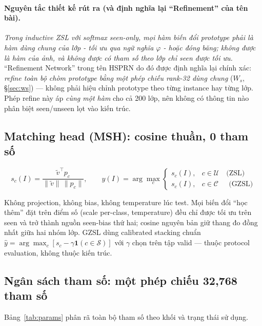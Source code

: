 \documentclass[10pt,twocolumn,letterpaper]{article}
\newcommand{\Seen}{\mathcal{S}}
\newcommand{\Unseen}{\mathcal{U}}
\newcommand{\All}{\mathcal{C}}
\newcommand{\vtilde}{\tilde{v}}
\begin{document}
\paragraph{Nguyên tắc thiết kế rút ra (và định nghĩa lại ``Refinement'' của tên bài).}
\emph{Trong inductive ZSL với softmax seen-only, mọi hàm biến đổi prototype phải là hàm dùng chung của lớp - tối ưu qua ngữ nghĩa $\varphi$ - hoặc đóng băng; không được là hàm của ảnh, và không được có tham số theo lớp chỉ seen được tối ưu.} ``Refinement Network'' trong tên HSPRN do đó được định nghĩa lại chính xác: \emph{refine toàn bộ chòm prototype bằng một phép chiếu rank-32 dùng chung} ($W_s$, §\ref{sec:ws}) — không phải hiệu chỉnh prototype theo từng instance hay từng lớp. Phép refine này áp \emph{cùng một hàm} cho cả 200 lớp, nên không có thông tin nào phân biệt seen/unseen lọt vào kiến trúc.

\subsection{Matching head (MSH): cosine thuần, 0 tham số}
\label{sec:msh}

\begin{equation}
s_c(I) = \frac{\vtilde^\top p_c}{\|\vtilde\|\,\|p_c\|},
\qquad
\hat y(I) = \arg\max_{c}
\begin{cases}
s_c(I), & c\in\Unseen \quad \text{(ZSL)}\\
s_c(I), & c\in\All \quad\ \ \text{(GZSL)}
\end{cases}
\label{eq:msh}
\end{equation}

Không projection, không bias, không temperature lúc test. Mọi biến đổi ``học thêm'' đặt trên điểm số (scale per-class, temperature) đều chỉ được tối ưu trên seen và trở thành nguồn seen-bias thứ hai; cosine nguyên bản giữ thang đo đồng nhất giữa hai nhóm lớp. GZSL dùng calibrated stacking chuẩn $\hat y = \arg\max_c [s_c - \gamma\mathbf 1(c\in\Seen)]$ với $\gamma$ chọn trên tập valid — thuộc protocol evaluation, không thuộc kiến trúc.

\subsection{Ngân sách tham số: một phép chiếu 32{,}768 tham số}
\label{sec:params}

Bảng~\ref{tab:params} phân rã toàn bộ tham số theo khối và trạng thái sử dụng.
\end{document}
